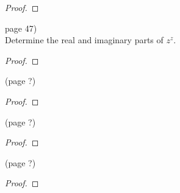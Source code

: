 \documentclass{article}
\newenvironment{problem}[2][Problem]{\begin{trivlist}
\item[\hskip \labelsep {\bfseries #1}\hskip \labelsep {\bfseries #2.}]}{\end{trivlist}}
\begin{document}
\begin{proof}
\end{proof}

\pagebreak

\begin{problem}{7} (page 47) \\
  Determine the real and imaginary parts of $z^z$.
\end{problem}

\begin{proof}
\end{proof}

\pagebreak

\begin{problem}{?} (page ?) \\
\end{problem}

\begin{proof}
\end{proof}

\pagebreak

\begin{problem}{?} (page ?) \\
\end{problem}

\begin{proof}
\end{proof}

\pagebreak

\begin{problem}{?} (page ?) \\
\end{problem}

\begin{proof}
\end{proof}
\end{document}

